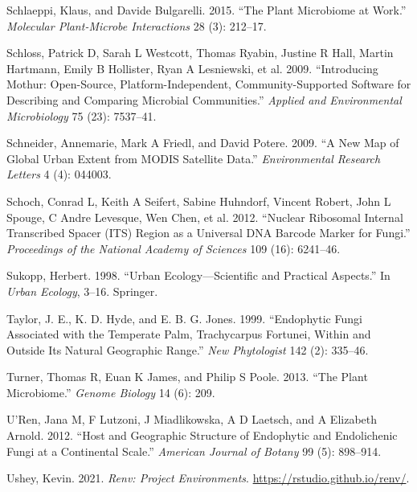 \documentclass[fleqn,10pt,lineno]{wlpeerj} %
\newlength{\cslhangindent}
\newenvironment{CSLReferences}[2] %
 {%
  \setlength{\parindent}{0pt}
  \ifodd #1 \everypar{\setlength{\hangindent}{\cslhangindent}}\ignorespaces\fi
  \ifnum #2 > 0
  \setlength{\parskip}{#2\baselineskip}
  \fi
 }%
 {}
\begin{document}
\begin{CSLReferences}{1}{0}
\leavevmode{}%
Schlaeppi, Klaus, and Davide Bulgarelli. 2015. {``The Plant Microbiome at Work.''} \emph{Molecular Plant-Microbe Interactions} 28 (3): 212--17.

\leavevmode{}%
Schloss, Patrick D, Sarah L Westcott, Thomas Ryabin, Justine R Hall, Martin Hartmann, Emily B Hollister, Ryan A Lesniewski, et al. 2009. {``Introducing Mothur: Open-Source, Platform-Independent, Community-Supported Software for Describing and Comparing Microbial Communities.''} \emph{Applied and Environmental Microbiology} 75 (23): 7537--41.

\leavevmode{}%
Schneider, Annemarie, Mark A Friedl, and David Potere. 2009. {``A New Map of Global Urban Extent from MODIS Satellite Data.''} \emph{Environmental Research Letters} 4 (4): 044003.

\leavevmode{}%
Schoch, Conrad L, Keith A Seifert, Sabine Huhndorf, Vincent Robert, John L Spouge, C Andre Levesque, Wen Chen, et al. 2012. {``Nuclear Ribosomal Internal Transcribed Spacer (ITS) Region as a Universal DNA Barcode Marker for Fungi.''} \emph{Proceedings of the National Academy of Sciences} 109 (16): 6241--46.

\leavevmode{}%
Sukopp, Herbert. 1998. {``Urban Ecology---Scientific and Practical Aspects.''} In \emph{Urban Ecology}, 3--16. Springer.

\leavevmode{}%
Taylor, J. E., K. D. Hyde, and E. B. G. Jones. 1999. {``Endophytic Fungi Associated with the Temperate Palm, Trachycarpus Fortunei, Within and Outside Its Natural Geographic Range.''} \emph{New Phytologist} 142 (2): 335--46.

\leavevmode{}%
Turner, Thomas R, Euan K James, and Philip S Poole. 2013. {``The Plant Microbiome.''} \emph{Genome Biology} 14 (6): 209.

\leavevmode{}%
U'Ren, Jana M, F Lutzoni, J Miadlikowska, A D Laetsch, and A Elizabeth Arnold. 2012. {``Host and Geographic Structure of Endophytic and Endolichenic Fungi at a Continental Scale.''} \emph{American Journal of Botany} 99 (5): 898--914.

\leavevmode{}%
Ushey, Kevin. 2021. \emph{Renv: Project Environments}. \url{https://rstudio.github.io/renv/}.


\end{CSLReferences}
\end{document}
